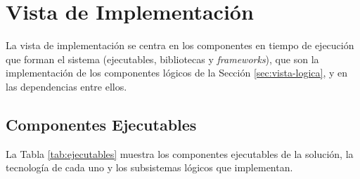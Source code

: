 \section{Vista de Implementación}\label{sec:vista-de-implementacion}

La vista de implementación se centra en los componentes en tiempo de ejecución que forman el sistema (ejecutables, bibliotecas y \textit{frameworks}), que son la implementación de los componentes lógicos de la Sección \ref{sec:vista-logica}, y en las dependencias entre ellos.

\subsection{Componentes Ejecutables}

La Tabla \ref{tab:ejecutables} muestra los componentes ejecutables de la solución, la tecnología de cada uno y los subsistemas lógicos que implementan.

